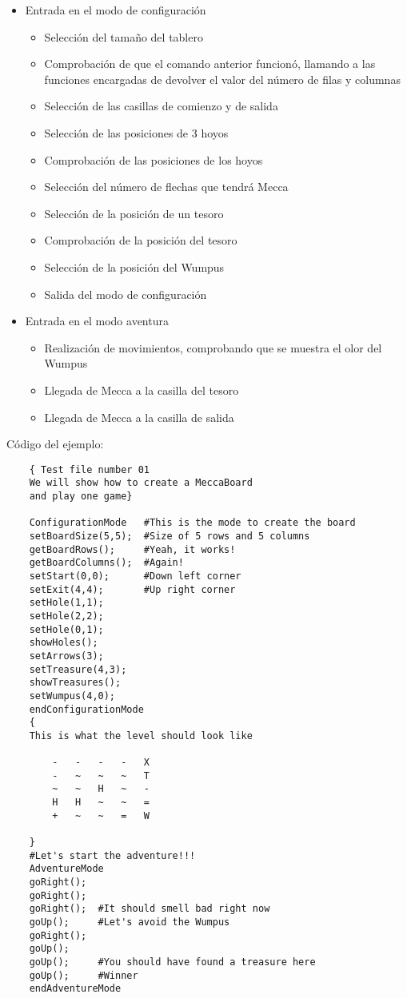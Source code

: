 \documentclass[a4paper,12pt,twoside,openright]{report}
\begin{document}
  \begin{itemize}
   \item Entrada en el modo de configuración
   \begin{itemize}
    \item Selección del tamaño del tablero
    \item Comprobación de que el comando anterior funcionó, llamando a las funciones 
    encargadas de devolver el valor del número de filas y columnas
    \item Selección de las casillas de comienzo y de salida
    \item Selección de las posiciones de 3 hoyos
    \item Comprobación de las posiciones de los hoyos
    \item Selección del número de flechas que tendrá Mecca
    \item Selección de la posición de un tesoro
    \item Comprobación de la posición del tesoro
    \item Selección de la posición del Wumpus
    \item Salida del modo de configuración
    \end{itemize}
   \item Entrada en el modo aventura
      \begin{itemize}
      \item Realización de movimientos, comprobando que se muestra el 
      olor del Wumpus
      \item Llegada de Mecca a la casilla del tesoro
      \item Llegada de Mecca a la casilla de salida
      \end{itemize}
   \end{itemize}
  
  Código del ejemplo:
  \begin{lstlisting}
    { Test file number 01
    We will show how to create a MeccaBoard 
    and play one game}

    ConfigurationMode   #This is the mode to create the board
    setBoardSize(5,5);  #Size of 5 rows and 5 columns
    getBoardRows();     #Yeah, it works!
    getBoardColumns();  #Again!
    setStart(0,0);      #Down left corner
    setExit(4,4);	    #Up right corner
    setHole(1,1);	    
    setHole(2,2);
    setHole(0,1);
    showHoles();
    setArrows(3);
    setTreasure(4,3);
    showTreasures();
    setWumpus(4,0);
    endConfigurationMode
    {
    This is what the level should look like

	    -	-	-	-	X
	    -	~	~	~	T
	    ~	~	H	~	-
	    H	H	~	~	=
	    +	~	~	=	W

    }
    #Let's start the adventure!!!
    AdventureMode
    goRight();
    goRight();
    goRight();	#It should smell bad right now
    goUp();		#Let's avoid the Wumpus
    goRight();
    goUp();
    goUp();		#You should have found a treasure here
    goUp();		#Winner
    endAdventureMode
  \end{lstlisting}
\end{document}
